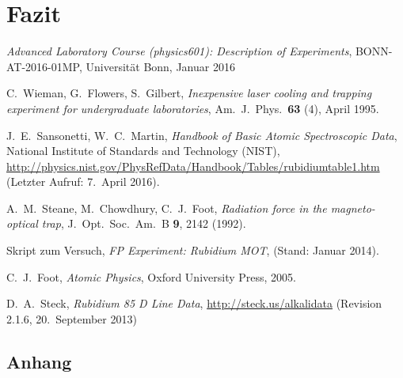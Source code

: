 \documentclass[11pt, a4paper]{article}
\numberwithin{equation}{section}
\begin{document}
\section{Fazit}


\FloatBarrier
\vspace{\fill}
\begin{thebibliography}{19}
	\emph{Advanced Laboratory Course (physics601): Description of Experiments}, BONN-AT-2016-01MP, Universität Bonn, Januar 2016

	C.\ Wieman, G.\ Flowers, S.\ Gilbert,
	\emph{Inexpensive laser cooling and trapping experiment for undergraduate laboratories},
	Am.\ J.\ Phys.\ \textbf{63} (4), April 1995.

	J.\ E.\ Sansonetti, W.\ C.\ Martin,
	\emph{Handbook of Basic Atomic Spectroscopic Data},
	National Institute of Standards and Technology (NIST), \url{http://physics.nist.gov/PhysRefData/Handbook/Tables/rubidiumtable1.htm} (Letzter Aufruf: 7.\ April 2016).

	A.\ M.\ Steane, M.\ Chowdhury, C.\ J.\ Foot,
	\emph{Radiation force in the magneto-optical trap},
	J.\ Opt.\ Soc.\ Am.\ B \textbf{9}, 2142 (1992).

	Skript zum Versuch,
	\emph{FP Experiment: Rubidium MOT},
	(Stand: Januar 2014).

	C.\ J.\ Foot,
	\emph{Atomic Physics},
	Oxford University Press, 2005.
	
	D.\ A.\ Steck,
	\emph{Rubidium 85 D Line Data},
	\url{http://steck.us/alkalidata} (Revision 2.1.6, 20.\ September 2013)
\end{thebibliography}

\begin{appendix}
\newpage
\section{Anhang}
\end{appendix}
\end{document}
